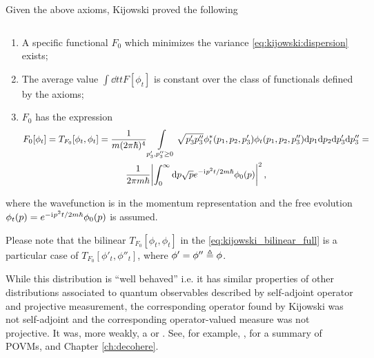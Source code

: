 Given the above axioms, Kijowski proved the following
\begin{theorem}
  $\,$

  \begin{enumerate}
    \item
      A specific functional $F_0$ which minimizes the variance
      \eqref{eq:kijowski:dispersion}
      exists;
    \item
      The average value $\int \dd{t} t F[\phi_t] $ is constant over the class of
      functionals defined by the axioms;
    \item
      $F_0$ has the expression
      \begin{multline}\label{eq:kijowski_bilinear_full}
        F_0[\phi_t] = T_{F_0}[\phi_t, \phi_t] =
            \frac{1}{m(2\pi\hbar)^4}
            \int\displaylimits_{p_{3}', p_{3}'' \ge 0} \sqrt{p_{3}' p_{3}''} \phi_t^{*}(p_1, p_2, p_{3}') \phi_t(p_1, p_2, p_{3}'')
            \dd p_1 \dd p_2 \dd p_{3}' \dd p_{3}''
            = \\
                      \frac{1}{2 \pi m \hbar} \abs{\int_0^{\infty} \dd p \sqrt{p} e^{-\mathrm{i}\mkern1mu p^{2} t / 2m\hbar} \phi_{0}(p)}^2
                      \, \text{,}
      \end{multline}
  \end{enumerate}
  where the wavefunction is in the momentum representation and the free evolution
  $\phi_t(p) = e^{-\mathrm{i}\mkern1mu p^{2} t / 2m\hbar}\phi_{0}(p)$
  is assumed.
\end{theorem}

Please note that the bilinear $T_{F_0}[\phi_t, \phi_t]$ in the \eqref{eq:kijowski_bilinear_full}
is a particular case of $T_{F_0}[\phi'_t, \phi''_t]$, where $\phi' = \phi'' \triangleq \phi$.

While this distribution is ``well behaved'' i.e. it has similar properties of other distributions
associated to quantum observables described by self-adjoint operator and projective measurement,
the corresponding operator found by Kijowski was not self-adjoint and the corresponding
operator-valued measure was not projective.
It was, more weakly, a  or .
See, for example, \cite[Sec. 10.3]{TQM1},
for a summary of POVMs, and Chapter \ref{ch:decohere}.


